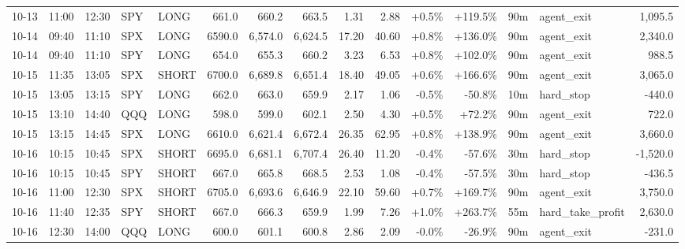 \documentclass[11pt,a4paper,twoside]{article}
\begin{document}
\begin{landscape}
\begin{center}
\begin{longtable}{>{\color{txtmain}}l l l l l r r r r r r r r >{\color{txtmain}}l r}
10-13 & 11:00 & 12:30 & SPY & LONG & 661.0 & 660.2 & 663.5 & 1.31 & 2.88 & \textcolor{wingreen}{+0.5\%} & \textcolor{wingreen}{+119.5\%} & 90m & agent\_exit & \textcolor{wingreen}{1,095.5} \\
10-14 & 09:40 & 11:10 & SPX & LONG & 6590.0 & 6,574.0 & 6,624.5 & 17.20 & 40.60 & \textcolor{wingreen}{+0.8\%} & \textcolor{wingreen}{+136.0\%} & 90m & agent\_exit & \textcolor{wingreen}{2,340.0} \\
10-14 & 09:40 & 11:10 & SPY & LONG & 654.0 & 655.3 & 660.2 & 3.23 & 6.53 & \textcolor{wingreen}{+0.8\%} & \textcolor{wingreen}{+102.0\%} & 90m & agent\_exit & \textcolor{wingreen}{988.5} \\
10-15 & 11:35 & 13:05 & SPX & SHORT & 6700.0 & 6,689.8 & 6,651.4 & 18.40 & 49.05 & \textcolor{wingreen}{+0.6\%} & \textcolor{wingreen}{+166.6\%} & 90m & agent\_exit & \textcolor{wingreen}{3,065.0} \\
10-15 & 13:05 & 13:15 & SPY & LONG & 662.0 & 663.0 & 659.9 & 2.17 & 1.06 & \textcolor{lossred}{-0.5\%} & \textcolor{lossred}{-50.8\%} & 10m & hard\_stop & \textcolor{lossred}{-440.0} \\
10-15 & 13:10 & 14:40 & QQQ & LONG & 598.0 & 599.0 & 602.1 & 2.50 & 4.30 & \textcolor{wingreen}{+0.5\%} & \textcolor{wingreen}{+72.2\%} & 90m & agent\_exit & \textcolor{wingreen}{722.0} \\
10-15 & 13:15 & 14:45 & SPX & LONG & 6610.0 & 6,621.4 & 6,672.4 & 26.35 & 62.95 & \textcolor{wingreen}{+0.8\%} & \textcolor{wingreen}{+138.9\%} & 90m & agent\_exit & \textcolor{wingreen}{3,660.0} \\
10-16 & 10:15 & 10:45 & SPX & SHORT & 6695.0 & 6,681.1 & 6,707.4 & 26.40 & 11.20 & \textcolor{lossred}{-0.4\%} & \textcolor{lossred}{-57.6\%} & 30m & hard\_stop & \textcolor{lossred}{-1,520.0} \\
10-16 & 10:15 & 10:45 & SPY & SHORT & 667.0 & 665.8 & 668.5 & 2.53 & 1.08 & \textcolor{lossred}{-0.4\%} & \textcolor{lossred}{-57.5\%} & 30m & hard\_stop & \textcolor{lossred}{-436.5} \\
10-16 & 11:00 & 12:30 & SPX & SHORT & 6705.0 & 6,693.6 & 6,646.9 & 22.10 & 59.60 & \textcolor{wingreen}{+0.7\%} & \textcolor{wingreen}{+169.7\%} & 90m & agent\_exit & \textcolor{wingreen}{3,750.0} \\
10-16 & 11:40 & 12:35 & SPY & SHORT & 667.0 & 666.3 & 659.9 & 1.99 & 7.26 & \textcolor{wingreen}{+1.0\%} & \textcolor{wingreen}{+263.7\%} & 55m & hard\_take\_profit & \textcolor{wingreen}{2,630.0} \\
10-16 & 12:30 & 14:00 & QQQ & LONG & 600.0 & 601.1 & 600.8 & 2.86 & 2.09 & \textcolor{lossred}{-0.0\%} & \textcolor{lossred}{-26.9\%} & 90m & agent\_exit & \textcolor{lossred}{-231.0} \\

\end{longtable}
\end{center}
\end{landscape}
\end{document}
